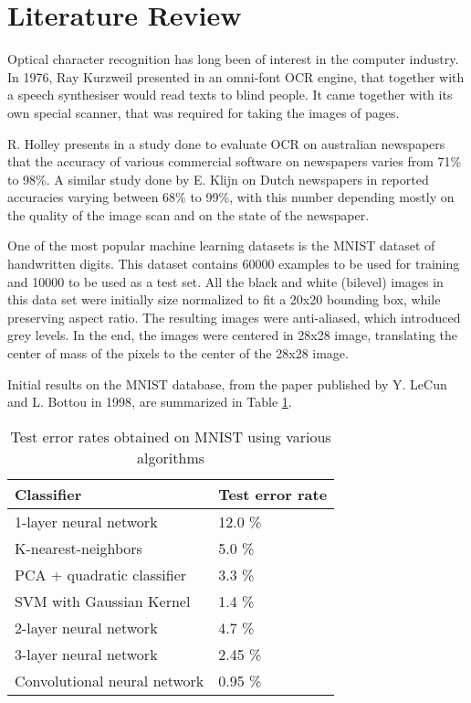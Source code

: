 \section{Literature Review}
\label{sec:lit_rev}
Optical character recognition has long been of interest in the computer industry. In 1976, Ray Kurzweil presented in \cite{schantz1982history} an omni-font OCR engine, that together with a speech synthesiser would read texts to blind people. It came together with its own special scanner, that was required for taking the images of pages. 

R. Holley presents in a study\cite{Holley_2009} done to evaluate OCR on australian newspapers that the accuracy of various commercial software on newspapers varies from 71\% to 98\%. A similar study done by E. Klijn on Dutch newspapers in \cite{klijn2008current} reported accuracies varying between 68\% to 99\%, with this number depending mostly on the quality of the image scan and on the state of the newspaper. 

One of the most popular machine learning datasets is the MNIST dataset of handwritten digits\cite{lecun1998mnist}. This dataset contains 60000 examples to be used for training and 10000 to be used as a test set. All the black and white (bilevel) images in this data set were initially size normalized to fit a 20x20 bounding box, while preserving aspect ratio. The resulting images were anti-aliased, which introduced grey levels. In the end, the images were centered in 28x28 image, translating the center of mass of the pixels to the center of the 28x28 image. 

Initial results on the MNIST database, from the paper published by Y. LeCun and L. Bottou in 1998\cite{Lecun_1998}, are summarized in Table \ref{table:mnist_results}. 

\begin{table}[h]
\caption{Test error rates obtained on MNIST using various algorithms}
\label{table:mnist_results}
\begin{tabular}{ll}
\hline
Classifier                   & Test error rate \\ \hline
1-layer neural network       & 12.0 \%           \\
K-nearest-neighbors          & 5.0  \%           \\
PCA + quadratic classifier   & 3.3  \%          \\
SVM with Gaussian Kernel     & 1.4  \%           \\
2-layer neural network       & 4.7  \%           \\
3-layer neural network       & 2.45 \%           \\
Convolutional neural network & 0.95 \%           \\ \hline
\end{tabular}
\end{table}

